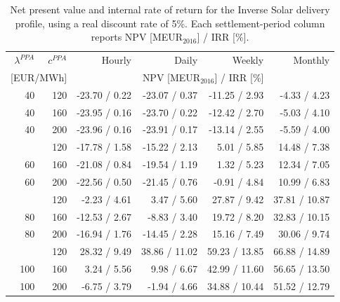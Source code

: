 \begin{table}[H]
\centering
\small
\caption{Net present value and internal rate of return for the Inverse Solar delivery profile, using a real discount rate of 5\%. Each settlement-period column reports NPV [MEUR$_{2016}$] / IRR [\%].}
\label{tab:npv_irr_inverse_solar}
\begin{tabular*}{\textwidth}{@{\extracolsep{\fill}}rrrrrr@{}}
\toprule
$\lambda^{PPA}$ & $c^{PPA}$ & Hourly & Daily & Weekly & Monthly \\
\multicolumn{2}{c}{[EUR/MWh]} & \multicolumn{4}{c}{NPV [MEUR$_{2016}$] / IRR [\%]} \\
\midrule
40 & 120 & -23.70 / 0.22 & -23.07 / 0.37 & -11.25 / 2.93 & -4.33 / 4.23 \\
40 & 160 & -23.95 / 0.16 & -23.70 / 0.22 & -12.42 / 2.70 & -5.03 / 4.10 \\
40 & 200 & -23.96 / 0.16 & -23.91 / 0.17 & -13.14 / 2.55 & -5.59 / 4.00 \\
\addlinespace
60 & 120 & -17.78 / 1.58 & -15.22 / 2.13 & 5.01 / 5.85 & 14.48 / 7.38 \\
60 & 160 & -21.08 / 0.84 & -19.54 / 1.19 & 1.32 / 5.23 & 12.34 / 7.05 \\
60 & 200 & -22.56 / 0.50 & -21.45 / 0.76 & -0.91 / 4.84 & 10.99 / 6.83 \\
\addlinespace
80 & 120 & -2.23 / 4.61 & 3.47 / 5.60 & 27.87 / 9.42 & 37.81 / 10.87 \\
80 & 160 & -12.53 / 2.67 & -8.83 / 3.40 & 19.72 / 8.20 & 32.83 / 10.15 \\
80 & 200 & -16.94 / 1.76 & -14.45 / 2.28 & 15.16 / 7.49 & 30.06 / 9.74 \\
\addlinespace
100 & 120 & 28.32 / 9.49 & 38.86 / 11.02 & 59.23 / 13.85 & 66.88 / 14.89 \\
100 & 160 & 3.24 / 5.56 & 9.98 / 6.67 & 42.99 / 11.60 & 56.65 / 13.50 \\
100 & 200 & -6.75 / 3.79 & -1.94 / 4.66 & 34.88 / 10.44 & 51.52 / 12.79 \\
\bottomrule
\end{tabular*}
\end{table}

